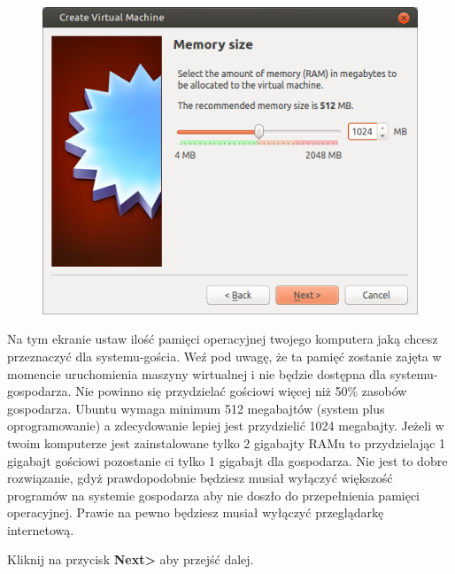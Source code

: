 \begin{figure}
                \includegraphics[width=\linewidth]{images/virtualbox_wizard2.png}
\end{figure}
Na tym ekranie ustaw ilość pamięci operacyjnej twojego komputera jaką chcesz przeznaczyć dla systemu-gościa. Weź pod uwagę, że ta pamięć zostanie zajęta w momencie uruchomienia maszyny wirtualnej i nie będzie dostępna dla systemu-gospodarza. Nie powinno się przydzielać gościowi więcej niż 50\% zasobów gospodarza. Ubuntu wymaga minimum 512 megabajtów (system plus oprogramowanie) a zdecydowanie lepiej jest przydzielić 1024 megabajty.
Jeżeli w twoim komputerze jest zainstalowane tylko 2 gigabajty RAMu to przydzielając 1 gigabajt gościowi pozostanie ci tylko 1 gigabajt dla gospodarza. Nie jest to dobre rozwiązanie, gdyż prawdopodobnie będziesz musiał wyłączyć większość programów na systemie gospodarza aby nie doszło do przepełnienia pamięci operacyjnej. Prawie na pewno będziesz musiał wyłączyć przeglądarkę internetową. 
\begin{flushright}
Kliknij na przycisk \textbf{Next\textgreater} aby przejść dalej.
\end{flushright}
\clearpage
